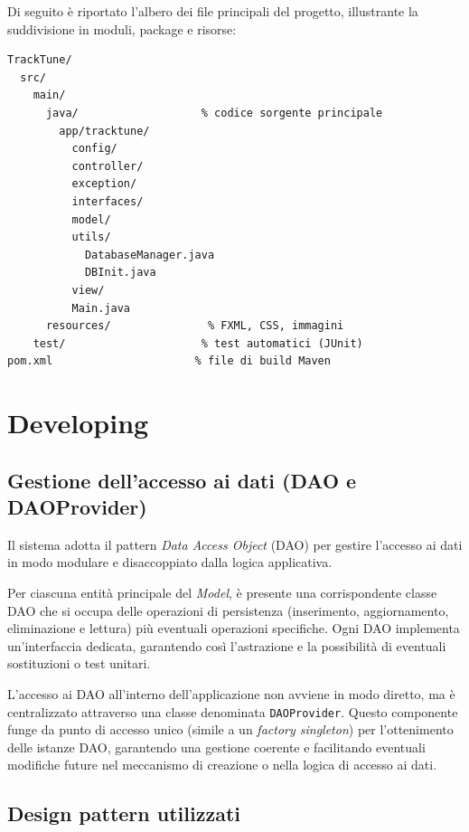 \documentclass[a4paper]{article}
\begin{document}
Di seguito è riportato l’albero dei file principali del progetto, illustrante la suddivisione in moduli, package e risorse:

\begin{lstlisting}[style=filetree]
TrackTune/
  src/
    main/
      java/                   % codice sorgente principale
        app/tracktune/
          config/
          controller/
          exception/
          interfaces/
          model/
          utils/
            DatabaseManager.java
            DBInit.java
          view/
          Main.java
      resources/               % FXML, CSS, immagini
    test/                     % test automatici (JUnit)
pom.xml                      % file di build Maven
\end{lstlisting}





\section{Developing}
\subsection{Gestione dell’accesso ai dati (DAO e DAOProvider)}
Il sistema adotta il pattern \textit{Data Access Object} (DAO) per gestire l’accesso ai dati in modo modulare e disaccoppiato dalla logica applicativa.

Per ciascuna entità principale del \textit{Model}, è presente una corrispondente classe DAO che si occupa delle operazioni di persistenza (inserimento, aggiornamento, eliminazione e lettura) più eventuali operazioni specifiche. Ogni DAO implementa un’interfaccia dedicata, garantendo così l’astrazione e la possibilità di eventuali sostituzioni o test unitari.

L’accesso ai DAO all’interno dell’applicazione non avviene in modo diretto, ma è centralizzato attraverso una classe denominata \texttt{DAOProvider}. Questo componente funge da punto di accesso unico (simile a un \textit{factory singleton}) per l’ottenimento delle istanze DAO, garantendo una gestione coerente e facilitando eventuali modifiche future nel meccanismo di creazione o nella logica di accesso ai dati.


\subsection{Design pattern utilizzati}
\end{document}
